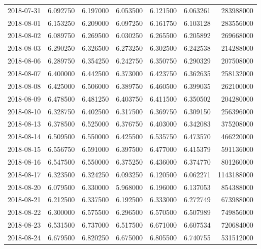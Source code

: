 \begin{tabular}{lrrrrrr}
2018-07-31 &    6.092750 &    6.197000 &    6.053500 &    6.121500 &    6.063261 &   283988000 \\
2018-08-01 &    6.153250 &    6.209000 &    6.097250 &    6.161750 &    6.103128 &   283556000 \\
2018-08-02 &    6.089750 &    6.269500 &    6.030250 &    6.265500 &    6.205892 &   269668000 \\
2018-08-03 &    6.290250 &    6.326500 &    6.273250 &    6.302500 &    6.242538 &   214288000 \\
2018-08-06 &    6.289750 &    6.354250 &    6.242750 &    6.350750 &    6.290329 &   207508000 \\
2018-08-07 &    6.400000 &    6.442500 &    6.373000 &    6.423750 &    6.362635 &   258132000 \\
2018-08-08 &    6.425000 &    6.506000 &    6.389750 &    6.460500 &    6.399035 &   262100000 \\
2018-08-09 &    6.478500 &    6.481250 &    6.403750 &    6.411500 &    6.350502 &   204280000 \\
2018-08-10 &    6.328750 &    6.402500 &    6.317500 &    6.369750 &    6.309150 &   256396000 \\
2018-08-13 &    6.378500 &    6.525000 &    6.376750 &    6.403000 &    6.342083 &   375208000 \\
2018-08-14 &    6.509500 &    6.550000 &    6.425500 &    6.535750 &    6.473570 &   466220000 \\
2018-08-15 &    6.556750 &    6.591000 &    6.397500 &    6.477000 &    6.415379 &   591136000 \\
2018-08-16 &    6.547500 &    6.550000 &    6.375250 &    6.436000 &    6.374770 &   801260000 \\
2018-08-17 &    6.323500 &    6.324250 &    6.093250 &    6.120500 &    6.062271 &  1143188000 \\
2018-08-20 &    6.079500 &    6.330000 &    5.968000 &    6.196000 &    6.137053 &   854388000 \\
2018-08-21 &    6.212500 &    6.337500 &    6.192500 &    6.333000 &    6.272749 &   673988000 \\
2018-08-22 &    6.300000 &    6.575500 &    6.296500 &    6.570500 &    6.507989 &   749856000 \\
2018-08-23 &    6.531500 &    6.737000 &    6.517500 &    6.671000 &    6.607534 &   720684000 \\
2018-08-24 &    6.679500 &    6.820250 &    6.675000 &    6.805500 &    6.740755 &   531512000 \\

\end{tabular}
